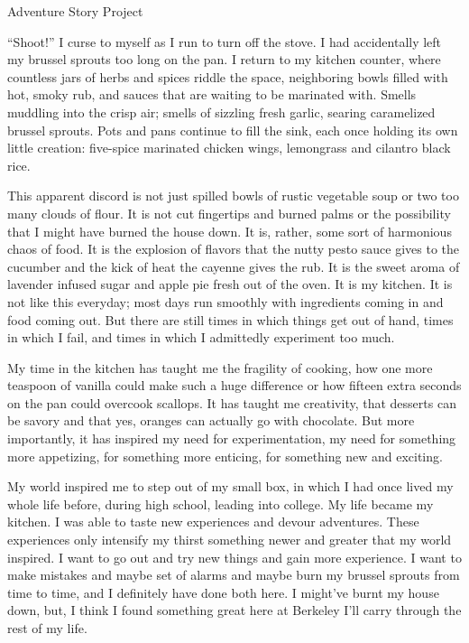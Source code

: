 \documentclass{article}
\begin{document}
\Huge Adventure Story Project

“Shoot!” I curse to myself as I run to turn off the stove. I had accidentally left my brussel sprouts too long on the pan. I return to my kitchen counter, where countless jars of herbs and spices riddle the space, neighboring bowls filled with hot, smoky rub, and sauces that are waiting to be marinated with. Smells muddling into the crisp air; smells of sizzling fresh garlic, searing caramelized brussel sprouts. Pots and pans continue to fill the sink, each once holding its own little creation: five-spice marinated chicken wings, lemongrass and cilantro black rice. \par
This apparent discord is not just spilled bowls of rustic vegetable soup or two too many clouds of flour. It is not cut fingertips and burned palms or the possibility that I might have burned the house down. It is, rather, some sort of harmonious chaos of food. It is the explosion of flavors that the nutty pesto sauce gives to the cucumber and the kick of heat the cayenne gives the rub. It is the sweet aroma of lavender infused sugar and apple pie fresh out of the oven. It is my kitchen. 
It is not like this everyday; most days run smoothly with ingredients coming in and food coming out. But there are still times in which things get out of hand, times in which I fail, and times in which I admittedly experiment too much. \par
My time in the kitchen has taught me the fragility of cooking, how one more teaspoon of vanilla could make such a huge difference or how fifteen extra seconds on the pan could overcook scallops. It has taught me creativity, that desserts can be savory and that yes, oranges can actually go with chocolate. But more importantly, it has inspired my need for experimentation, my need for something more appetizing, for something more enticing, for something new and exciting. \par
My world inspired me to step out of my small box, in which I had once lived my whole life before, during high school, leading into college. My life became my kitchen. I was able to taste new experiences and devour adventures. These experiences only intensify my thirst something newer and greater that my world inspired. I want to go out and try new things and gain more experience. I want to make mistakes and maybe set of alarms and maybe burn my brussel sprouts from time to time, and I definitely have done both here. I might’ve burnt my house down, but, I think I found something great here at Berkeley I’ll carry through the rest of my life.
\end{document}
